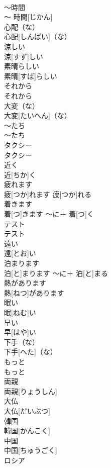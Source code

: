 \documentclass[8pt]{extreport}
\begin{document}
\begin{CJK}{UTF8}{min}
\\	〜時間	
\\	〜 時間[じかん]		
\\	心配（な）	
\\	心配[しんぱい]（な）		
\\	涼しい	
\\	涼[すず]しい		
\\	素晴らしい	
\\	素晴[すば]らしい		
\\	それから	
\\	それから		
\\	大変（な）	
\\	大変[たいへん]（な）		
\\	〜たち	
\\	〜たち		
\\	タクシー	
\\	タクシー		
\\	近く	
\\	近[ちか]く		
\\	疲れます	
\\	疲[つか]れます	疲[つか]れる	
\\	着きます	
\\	着[つ]きます	〜に＋ 着[つ]く	
\\	テスト	
\\	テスト		
\\	遠い	
\\	遠[とお]い		
\\	泊まります	
\\	泊[と]まります	〜に＋ 泊[と]まる	
\\	熱があります	
\\	熱[ねつ]があります		
\\	眠い	
\\	眠[ねむ]い		
\\	早い	
\\	早[はや]い		
\\	下手（な）	
\\	下手[へた]（な）		
\\	もっと	
\\	もっと		
\\	両親	
\\	両親[りょうしん]		
\\	大仏	
\\	大仏[だいぶつ]		
\\	韓国	
\\	韓国[かんこく]		
\\	中国	
\\	中国[ちゅうごく]		
\\	ロシア	

\end{CJK}
\end{document}
